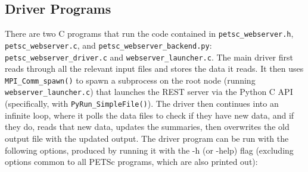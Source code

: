 \documentclass[11pt]{article}
\begin{document}
\subsection*{Driver Programs}
There are two C programs that run the code contained in \lstinline{petsc_webserver.h}, \lstinline{petsc_webserver.c}, and \lstinline{petsc_webserver_backend.py}: \lstinline{petsc_webserver_driver.c} and \lstinline{webserver_launcher.c}. The main driver first reads through all the relevant input files and stores the data it reads. It then uses \lstinline{MPI_Comm_spawn()} to spawn a subprocess on the root node (running \lstinline{webserver_launcher.c}) that launches the REST server via the Python C API (specifically, with \lstinline{PyRun_SimpleFile()}). The driver then continues into an infinite loop, where it polls the data files to check if they have new data, and if they do, reads that new data, updates the summaries, then overwrites the old output file with the updated output. The driver program can be run with the following options, produced by running it with the -h (or -help) flag (excluding options common to all PETSc programs, which are also printed out):
\end{document}
